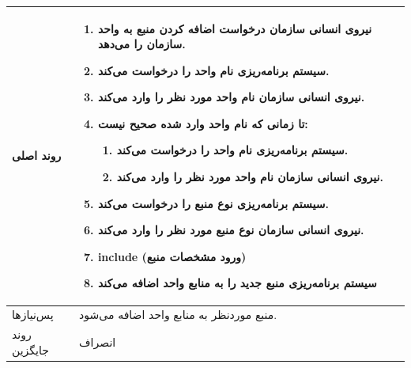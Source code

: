 \begin{table}[H]
\begin{tabular}{|p{3cm}|p{10cm}|}
		
		روند اصلی &
		\begin{enumerate}[topsep=0cm,leftmargin=0.5cm]
			\item نیروی انسانی سازمان درخواست اضافه کردن منبع به واحد سازمان را می‌دهد.
			\item سیستم برنامه‌ریزی نام واحد را درخواست می‌کند.
			\item نیروی انسانی سازمان نام واحد مورد نظر را وارد می‌کند.
			\item تا زمانی که نام واحد وارد شده صحیح نیست:
			\begin{enumerate}[topsep=0cm,leftmargin=0.5cm]
				\item سیستم برنامه‌ریزی نام واحد را درخواست می‌کند.
				\item نیروی انسانی سازمان نام واحد مورد نظر را وارد می‌کند.
			\end{enumerate}
			\item سیستم برنامه‌ریزی نوع منبع را درخواست می‌کند.
			\item نیروی انسانی سازمان نوع منبع مورد نظر را وارد می‌کند.
			\item include (ورود مشخصات منبع)
			\item سیستم برنامه‌ریزی منبع جدید را به منابع واحد اضافه می‌کند
		\end{enumerate} \\
		
		\hline
		
		پس‌نیازها &
		منبع موردنظر به منابع واحد اضافه می‌شود. \\
		
		\hline
		روند جایگزین
		& انصراف \\
		\hline
		
	\end{tabular}
\end{table}

